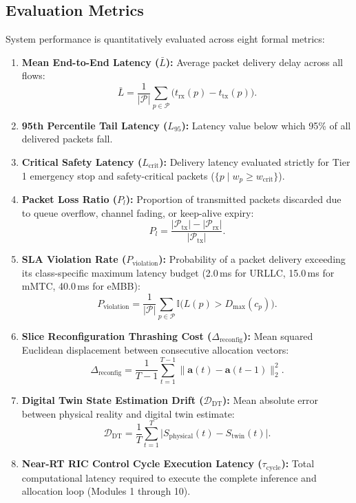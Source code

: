 \documentclass[twocolumn,10pt,twoside]{article}
\begin{document}
\subsection{Evaluation Metrics}
System performance is quantitatively evaluated across eight formal metrics:
\begin{enumerate}
    \item \textbf{Mean End-to-End Latency ($\bar{L}$):} Average packet delivery delay across all flows:
\begin{equation}
\bar{L} = \frac{1}{|\mathcal{P}|} \sum_{p \in \mathcal{P}} \big(t_{\text{rx}}(p) - t_{\text{tx}}(p)\big).
\label{eq:mean_latency}
\end{equation}
    \item \textbf{95th Percentile Tail Latency ($L_{95}$):} Latency value below which 95\% of all delivered packets fall.
    \item \textbf{Critical Safety Latency ($L_{\text{crit}}$):} Delivery latency evaluated strictly for Tier 1 emergency stop and safety-critical packets ($\{p \mid w_p \ge w_{\text{crit}}\}$).
    \item \textbf{Packet Loss Ratio ($P_l$):} Proportion of transmitted packets discarded due to queue overflow, channel fading, or keep-alive expiry:
\begin{equation}
P_l = \frac{|\mathcal{P}_{\text{tx}}| - |\mathcal{P}_{\text{rx}}|}{|\mathcal{P}_{\text{tx}}|}.
\label{eq:packet_loss_ratio}
\end{equation}
    \item \textbf{SLA Violation Rate ($P_{\text{violation}}$):} Probability of a packet delivery exceeding its class-specific maximum latency budget (2.0\,ms for URLLC, 15.0\,ms for mMTC, 40.0\,ms for eMBB):
\begin{equation}
P_{\text{violation}} = \frac{1}{|\mathcal{P}|} \sum_{p \in \mathcal{P}} \mathbb{I}\big(L(p) > D_{\max}(c_p)\big).
\label{eq:sla_violation_rate}
\end{equation}
    \item \textbf{Slice Reconfiguration Thrashing Cost ($\Delta_{\text{reconfig}}$):} Mean squared Euclidean displacement between consecutive allocation vectors:
\begin{equation}
\Delta_{\text{reconfig}} = \frac{1}{T-1} \sum_{t=1}^{T-1} \|\mathbf{a}(t) - \mathbf{a}(t-1)\|_2^2.
\label{eq:thrashing_cost}
\end{equation}
    \item \textbf{Digital Twin State Estimation Drift ($\mathcal{D}_{\text{DT}}$):} Mean absolute error between physical reality and digital twin estimate:
\begin{equation}
\mathcal{D}_{\text{DT}} = \frac{1}{T} \sum_{t=1}^T \big|S_{\text{physical}}(t) - S_{\text{twin}}(t)\big|.
\label{eq:fidelity_drift}
\end{equation}
    \item \textbf{Near-RT RIC Control Cycle Execution Latency ($\tau_{\text{cycle}}$):} Total computational latency required to execute the complete inference and allocation loop (Modules 1 through 10).
\end{enumerate}
\end{document}
